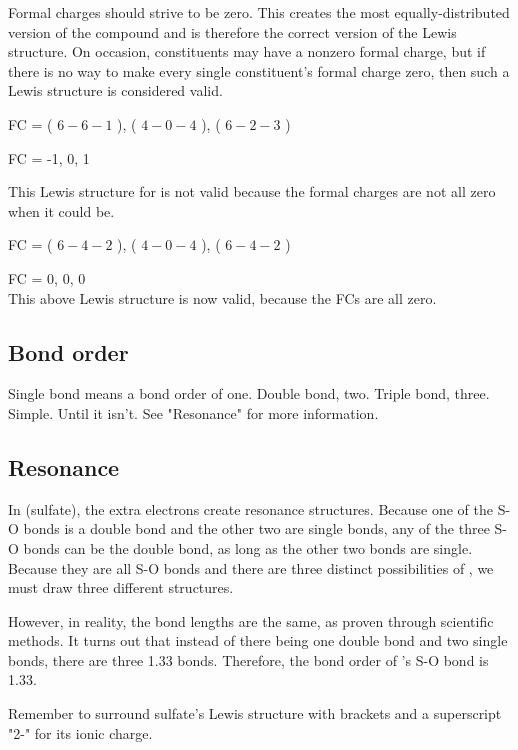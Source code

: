 \documentclass[letterpaper, 12pt]{article}
\begin{document}
	Formal charges should strive to be zero. This creates the most equally-distributed version of the compound and is therefore the correct version of the Lewis structure. On occasion, constituents may have a nonzero formal charge, but if there is no way to make every single constituent's formal charge zero, then such a Lewis structure is considered valid.\\
	
	
	FC = ( $6 - 6 - 1$ ), ( $4 - 0 - 4$ ), ( $6 - 2 - 3$ )
	
	FC = -1, 0, 1
	
	This Lewis structure for  is not valid because the formal charges are not all zero when it could be.\\
	
	
	FC = ( $6 - 4 - 2$ ), ( $4 - 0 - 4$ ), ( $6 - 4 - 2$ )
	
	FC = 0, 0, 0\\
	
	This above Lewis structure is now valid, because the FCs are all zero.
	
	\subsection{Bond order}
	Single bond means a bond order of one. Double bond, two. Triple bond, three. Simple. Until it isn't. See "Resonance" for more information.
	
	\subsection{Resonance}
	In  (sulfate), the extra electrons create resonance structures. Because one of the S-O bonds is a double bond and the other two are single bonds, any of the three S-O bonds can be the double bond, as long as the other two bonds are single. Because they are all S-O bonds and there are three distinct possibilities of , we must draw three different structures.
	
	However, in reality, the  bond lengths are the same, as proven through scientific methods. It turns out that instead of there being one double bond and two single bonds, there are three 1.33 bonds. Therefore, the bond order of 's S-O bond is 1.33.
	
	Remember to surround sulfate's Lewis structure with brackets and a superscript "2-" for its ionic charge.
	
\end{document}
